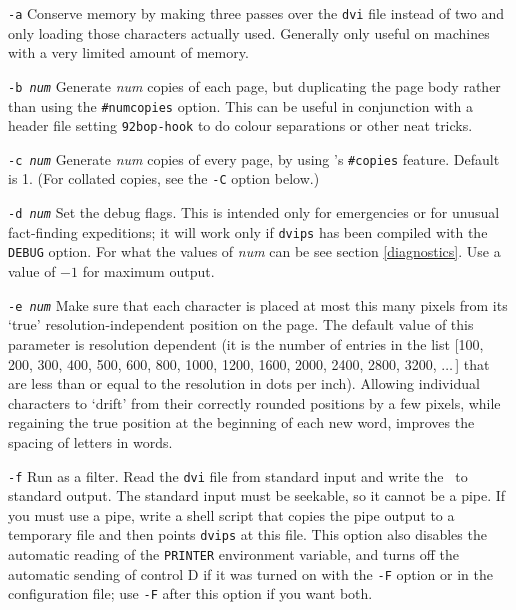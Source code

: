 \begin{list}%
{}%
{\settowidth{\labelwidth}{\tt -P \em printername}
\settowidth{\labelsep}{aaaa}
\settowidth{\rightmargin}{aaa}
\addtolength{\labelwidth}{\labelsep}
\setlength{\leftmargin}{\labelwidth}}
%

\item [\tt -a]  Conserve memory by making three passes over the {\tt dvi} file
instead of two and only loading those characters actually used.
Generally only useful on machines with a very limited amount of
memory.

\item [\tt -b \em num] Generate {\it num} copies of each page, but duplicating the
page body rather than using the {\tt\#numcopies} option.  This can be
useful in conjunction with a header file setting {\tt\char92bop-hook}
to do colour separations or other neat tricks.

\item [\tt -c \em num] Generate {\it num} copies of every page, by using
\PS 's {\tt \#copies} feature.
Default is 1. (For collated copies, see the {\tt -C} option below.)

\item [\tt -d \em num]  Set the debug flags.  This is intended only for emergencies
or for unusual fact-finding expeditions; it will work only if
{\tt dvips} has been compiled with the {\tt DEBUG} option.
For what the values of {\it num} can be see section \ref{diagnostics}.
Use a value of $-1$ for maximum output.

\item [\tt -e \em num]
Make sure that each character is placed at most this many pixels from its
`true' resolution-independent
position on the page. The default value of this parameter
is resolution dependent (it is the number
of entries in the list [100, 200, 300, 400, 500, 600, 800, 1000, 1200, 1600,
2000, 2400, 2800, 3200, $\ldots\,$] that are less than or equal to the
resolution in dots per inch). Allowing individual
characters to `drift' from their correctly rounded positions
by a few pixels, while regaining the true position at the beginning of
each new word, improves the spacing of letters in words.

\item [\tt -f] Run as a filter.
Read the {\tt dvi} file from standard input and write the \PS\ to
standard output.  The standard input must be seekable, so it cannot
be a pipe.  If you must use a pipe, write a shell script that copies
the pipe output to a temporary file and then points {\tt dvips} at this file.
This option also disables the automatic reading of the {\tt PRINTER}
environment variable, and turns off the automatic sending of control D
if it was turned on with the {\tt -F} option or in the configuration file;
use {\tt -F} after this option if you want both.


\end{list}

